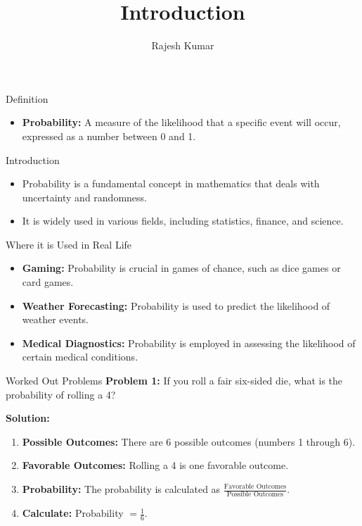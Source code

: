 
\title{Introduction}
\author{Rajesh Kumar}
\date{}

\begin{frame}
  \titlepage
\end{frame}

\begin{frame}{Definition}
  \begin{itemize}
    \item \textbf{Probability:} A measure of the likelihood that a specific event will occur, expressed as a number between 0 and 1.
  \end{itemize}
\end{frame}

\begin{frame}{Introduction}
  \begin{itemize}
    \item Probability is a fundamental concept in mathematics that deals with uncertainty and randomness.
    \item It is widely used in various fields, including statistics, finance, and science.
  \end{itemize}
\end{frame}

\begin{frame}{Where it is Used in Real Life}
  \begin{itemize}
    \item \textbf{Gaming:} Probability is crucial in games of chance, such as dice games or card games.
    \item \textbf{Weather Forecasting:} Probability is used to predict the likelihood of weather events.
    \item \textbf{Medical Diagnostics:} Probability is employed in assessing the likelihood of certain medical conditions.
  \end{itemize}
\end{frame}

\begin{frame}{Worked Out Problems}
  \textbf{Problem 1:} If you roll a fair six-sided die, what is the probability of rolling a 4?

  \textbf{Solution:}
  \begin{enumerate}
    \item \textbf{Possible Outcomes:} There are 6 possible outcomes (numbers 1 through 6).
    \item \textbf{Favorable Outcomes:} Rolling a 4 is one favorable outcome.
    \item \textbf{Probability:} The probability is calculated as $\frac{\text{Favorable Outcomes}}{\text{Possible Outcomes}}$.
    \item \textbf{Calculate:} Probability $= \frac{1}{6}$.
  \end{enumerate}
\end{frame}

